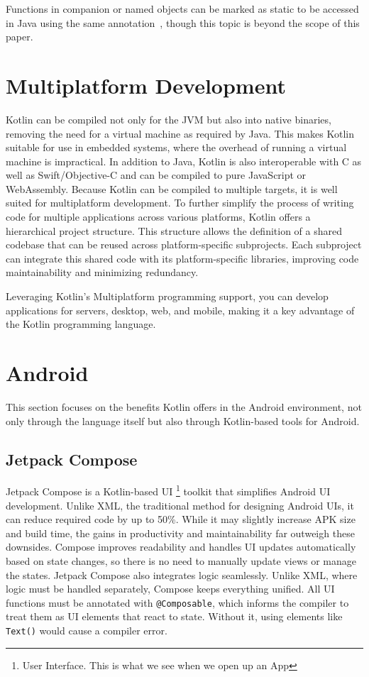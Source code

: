 \documentclass[a4paper,11pt]{article}
\begin{document}
Functions in companion or named objects can be marked as static to be accessed in Java using the same annotation~\cite{interop-static-fields}, though this topic is beyond the scope of this paper.

\section{Multiplatform Development}
Kotlin can be compiled not only for the JVM but also into native binaries, removing the need for a virtual machine as required by Java. This makes Kotlin suitable for use in embedded systems, where the overhead of running a virtual machine is impractical. In addition to Java, Kotlin is also interoperable with C as well as Swift/Objective-C and can be compiled to pure JavaScript or WebAssembly. Because Kotlin can be compiled to multiple targets, it is well suited for multiplatform development. To further simplify the process of writing code for multiple applications across various platforms, Kotlin offers a hierarchical project structure. This structure allows the definition of a shared codebase that can be reused across platform-specific subprojects. Each subproject can integrate this shared code with its platform-specific libraries, improving code maintainability and minimizing redundancy.

Leveraging Kotlin's Multiplatform programming support, you can develop applications for servers, desktop, web, and mobile, making it a key advantage of the Kotlin programming language. 

\section{Android}
This section focuses on the benefits Kotlin offers in the Android environment, not only through the language itself but also through Kotlin-based tools for Android.

\subsection{Jetpack Compose}\label{sec:jetpack}
Jetpack Compose is a Kotlin-based UI \footnote{User Interface. This is what we see when we open up an App} toolkit that simplifies Android UI development. Unlike XML, the traditional method for designing Android UIs, it can reduce required code by up to 50\%. While it may slightly increase APK size and build time, the gains in productivity and maintainability far outweigh these downsides.
Compose improves readability and handles UI updates automatically based on state changes, so there is no need to manually update views or manage the states.
Jetpack Compose also integrates logic seamlessly. Unlike XML, where logic must be handled separately, Compose keeps everything unified.
All UI functions must be annotated with \texttt{@Composable}, which informs the compiler to treat them as UI elements that react to state. Without it, using elements like \texttt{Text()} would cause a compiler error.
\end{document}
